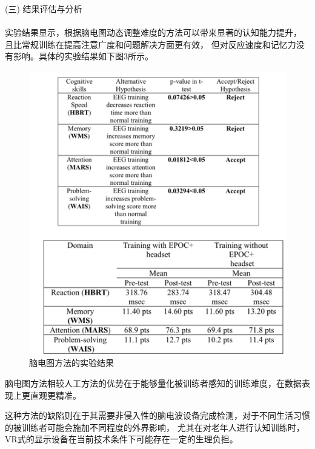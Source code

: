 \documentclass[12pt]{article}
\begin{document}
            (三) 结果评估与分析\paragraph{}
            实验结果显示，根据脑电图动态调整难度的方法可以带来显著的认知能力提升，
            且比常规训练在提高注意广度和问题解决方面更有效，
            但对反应速度和记忆力没有影响。具体的实验结果如下图3所示。
            \begin{figure}[H]
            	\centering
            	\includegraphics[scale=1.0]{images/brain_data.png}
            	\caption{脑电图方法的实验结果}
            	\label{fig:label}
            \end{figure}

            脑电图方法相较人工方法的优势在于能够量化被训练者感知的训练难度，在数据表现上更直观更精准。

            这种方法的缺陷则在于其需要非侵入性的脑电波设备完成检测，对于不同生活习惯的被训练者可能会施加不同程度的外界影响，
            尤其在对老年人进行认知训练时，VR式的显示设备在当前技术条件下可能存在一定的生理负担。
\end{document}
